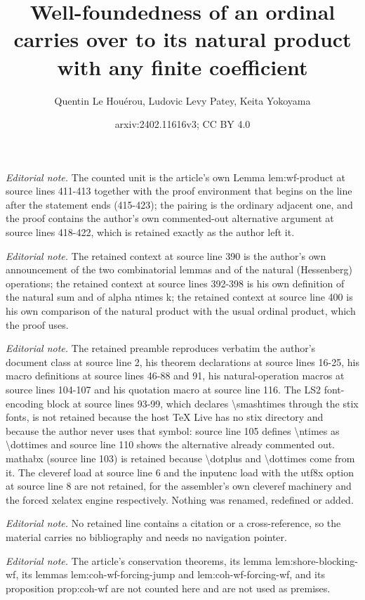 \documentclass{article}
\title{Well-foundedness of an ordinal carries over to its natural product with any finite coefficient}
\author{Quentin Le Houérou, Ludovic Levy Patey, Keita Yokoyama}
\date{arxiv:2402.11616v3; CC BY 4.0}
\numberwithin{theorem}{section}
\begin{document}
\maketitle
\noindent\textit{Editorial note.} The counted unit is the article's own Lemma lem:wf-product at source lines 411-413 together with the proof environment that begins on the line after the statement ends (415-423); the pairing is the ordinary adjacent one, and the proof contains the author's own commented-out alternative argument at source lines 418-422, which is retained exactly as the author left it.\par\medskip
\noindent\textit{Editorial note.} The retained context at source line 390 is the author's own announcement of the two combinatorial lemmas and of the natural (Hessenberg) operations; the retained context at source lines 392-398 is his own definition of the natural sum and of alpha ntimes k; the retained context at source line 400 is his own comparison of the natural product with the usual ordinal product, which the proof uses.\par\medskip
\noindent\textit{Editorial note.} The retained preamble reproduces verbatim the author's document class at source line 2, his theorem declarations at source lines 16-25, his macro definitions at source lines 46-88 and 91, his natural-operation macros at source lines 104-107 and his quotation macro at source line 116. The LS2 font-encoding block at source lines 93-99, which declares \textbackslash{}smashtimes through the stix fonts, is not retained because the host TeX Live has no stix directory and because the author never uses that symbol: source line 105 defines \textbackslash{}ntimes as \textbackslash{}dottimes and source line 110 shows the alternative already commented out. mathabx (source line 103) is retained because \textbackslash{}dotplus and \textbackslash{}dottimes come from it. The cleveref load at source line 6 and the inputenc load with the utf8x option at source line 8 are not retained, for the assembler's own cleveref machinery and the forced xelatex engine respectively. Nothing was renamed, redefined or added.\par\medskip
\noindent\textit{Editorial note.} No retained line contains a citation or a cross-reference, so the material carries no bibliography and needs no navigation pointer.\par\medskip
\noindent\textit{Editorial note.} The article's conservation theorems, its lemma lem:shore-blocking-wf, its lemmas lem:coh-wf-forcing-jump and lem:coh-wf-forcing-wf, and its proposition prop:coh-wf are not counted here and are not used as premises.\par\medskip
\end{document}
